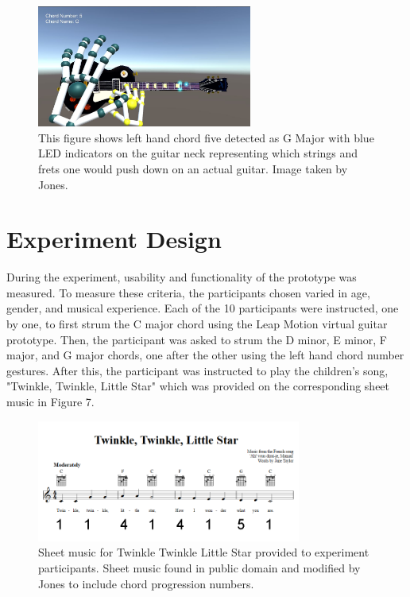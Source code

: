 \documentclass{vgtc}                          %
\begin{document}
\begin{figure}[H]
\centering
\includegraphics[height=4cm]{pictures/Strumming_with_chord_number.JPG}
\centering
\caption{This figure shows left hand chord five detected as G Major with blue LED indicators on the guitar neck representing which strings and frets one would push down on an actual guitar. Image taken by Jones.}
\end{figure}

\section{Experiment Design}

During the experiment, usability and functionality of the prototype was measured. To measure these criteria, the participants chosen varied in age, gender, and musical experience. Each of the 10 participants were instructed, one by one, to first strum the C major chord using the Leap Motion virtual guitar prototype. Then, the participant was asked to strum the D minor, E minor, F major, and G major chords, one after the other using the left hand chord number gestures. After this, the participant was instructed to play the children's song, "Twinkle, Twinkle, Little Star" which was provided on the corresponding sheet music in Figure 7. 

\begin{figure}[H]
\centering
\includegraphics[height=4cm]{pictures/ttlstar-sheet-music.png}
\centering
\caption{Sheet music for Twinkle Twinkle Little Star provided to experiment participants.  Sheet music found in public domain and modified by Jones to include chord progression numbers.}
\end{figure}
\end{document}
